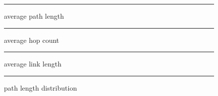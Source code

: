 \documentclass[12pt]{article}
\theoremstyle{definition}
\begin{document}
\begin{figure}[htb]
  \centering
  \begin{subfigure} {\texttt{[image: path\_length\_average\_benchmark.png]}} \end{subfigure}
  \rule{\linewidth}{1pt}
  \caption{average path length}
  \label{fig:path_length_average_benchmark}
\end{figure}

\begin{figure}[htb]
  \centering
  \begin{subfigure} {\texttt{[image: hop\_count\_average\_benchmark]}} \end{subfigure}
  \rule{\linewidth}{1pt}
  \caption{average hop count}
  \label{fig:hop_count_average_benchmark}
\end{figure}

\begin{figure}[htb]
  \centering
  \begin{subfigure} {\texttt{[image: link\_length\_average\_benchmark.png]}} \end{subfigure}
  \rule{\linewidth}{1pt}
  \caption{average link length}
  \label{fig:link_length_average_benchmark}
\end{figure}

\begin{figure}[htb]
  \centering
  \begin{subfigure} {\texttt{[image: path\_lengths\_canneal.png]}} \end{subfigure}
  \begin{subfigure} {\texttt{[image: path\_lengths\_dedup.png]}} \end{subfigure}
  \begin{subfigure} {\texttt{[image: path\_lengths\_fft.png]}} \end{subfigure}
  \begin{subfigure} {\texttt{[image: path\_lengths\_fluidanimate.png]}} \end{subfigure}
  \begin{subfigure} {\texttt{[image: path\_lengths\_lu.png]}} \end{subfigure}
  \begin{subfigure} {\texttt{[image: path\_lengths\_radix.png]}} \end{subfigure}
  \begin{subfigure} {\texttt{[image: path\_lengths\_vips.png]}} \end{subfigure}
  \begin{subfigure} {\texttt{[image: path\_lengths\_water.png]}} \end{subfigure}
  \rule{\linewidth}{1pt}
  \caption{path length distribution}
  \label{fig:path_lengths}
\end{figure}
\end{document}
